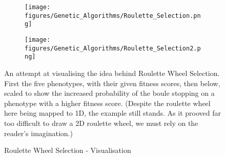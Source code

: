 \begin{figure}[H]
    \centering
    \begin{subfigure}[t]{0.8\textwidth}
        \centering
        \texttt{[image: figures/Genetic\_Algorithms/Roulette\_Selection.png]}
    \end{subfigure}
    \begin{subfigure}[b]{0.8\textwidth}
        \centering
        \texttt{[image: figures/Genetic\_Algorithms/Roulette\_Selection2.png]}
    \end{subfigure}
    
    \caption{Roulette Wheel Selection - Visualisation}
    \small
    \raggedright
    An attempt at visualising the idea behind Roulette Wheel Selection. First the five phenotypes, with their given fitness scores, then below, scaled to show the increased probability of the boule stopping on a phenotype with a higher fitness score. (Despite the roulette wheel here being mapped to 1D, the example still stands. As it prooved far too difficult to draw a 2D roulette wheel, we must rely on the reader's imagination.)
    \label{fig:GA_Roulette_Selection}
\end{figure}


